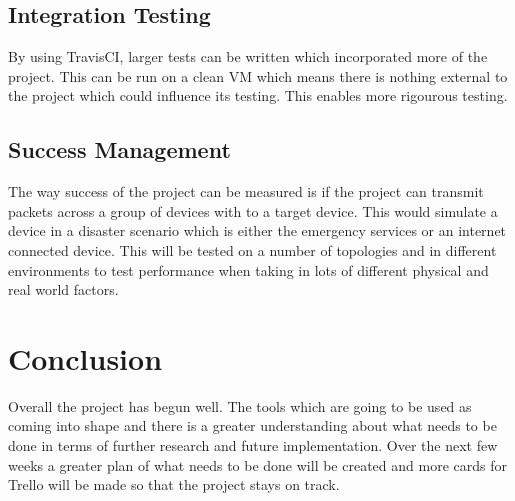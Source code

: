 \documentclass{report}
\begin{document}
\section*{Integration Testing}

By using TravisCI, larger tests can be written which incorporated more of the project. This can be run on a clean VM which 
means there is nothing external to the project which could influence its testing. This enables more rigourous testing. 

\section*{Success Management}

The way success of the project can be measured is if the project can transmit packets across a group of devices with to a 
target device. This would simulate a device in a disaster scenario which is either the emergency services or an internet 
connected device. This will be tested on a number of topologies and in different environments to test performance when taking 
in lots of different physical and real world factors.


\chapter*{Conclusion}

Overall the project has begun well. The tools which are going to be used as coming into shape and there is a greater 
understanding about what needs to be done in terms of further research and future implementation. Over the next few 
weeks a greater plan of what needs to be done will be created and more cards for Trello will be made so that the 
project stays on track.


{}

\end{document}

